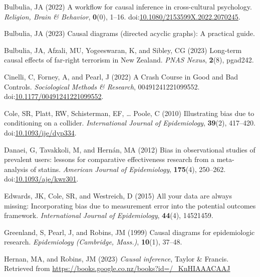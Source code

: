 \documentclass[
  singlecolumn]{article}
\newlength{\cslhangindent}
\newenvironment{CSLReferences}[2] %
 {\begin{list}{}{%
  \setlength{\itemindent}{0pt}
  \setlength{\leftmargin}{0pt}
  \setlength{\parsep}{0pt}
  \ifodd #1
   \setlength{\leftmargin}{\cslhangindent}
   \setlength{\itemindent}{-1\cslhangindent}
  \fi
  \setlength{\itemsep}{#2\baselineskip}}}
 {\end{list}}
\begin{document}
\label{refs}
\begin{CSLReferences}{1}{0}
Bulbulia, JA (2022) A workflow for causal inference in cross-cultural
psychology. \emph{Religion, Brain \& Behavior}, \textbf{0}(0), 1--16.
doi:\href{https://doi.org/10.1080/2153599X.2022.2070245}{10.1080/2153599X.2022.2070245}.

Bulbulia, JA (2023) Causal diagrams (directed acyclic graphs): A
practical guide.

Bulbulia, JA, Afzali, MU, Yogeeswaran, K, and Sibley, CG (2023)
Long-term causal effects of far-right terrorism in {N}ew {Z}ealand.
\emph{PNAS Nexus}, \textbf{2}(8), pgad242.

Cinelli, C, Forney, A, and Pearl, J (2022) A Crash Course in Good and
Bad Controls. \emph{Sociological Methods \& Research},
00491241221099552.
doi:\href{https://doi.org/10.1177/00491241221099552}{10.1177/00491241221099552}.

Cole, SR, Platt, RW, Schisterman, EF, \ldots{} Poole, C (2010)
Illustrating bias due to conditioning on a collider. \emph{International
Journal of Epidemiology}, \textbf{39}(2), 417--420.
doi:\href{https://doi.org/10.1093/ije/dyp334}{10.1093/ije/dyp334}.

Danaei, G, Tavakkoli, M, and Hernán, MA (2012) Bias in observational
studies of prevalent users: lessons for comparative effectiveness
research from a meta-analysis of statins. \emph{American Journal of
Epidemiology}, \textbf{175}(4), 250--262.
doi:\href{https://doi.org/10.1093/aje/kwr301}{10.1093/aje/kwr301}.

Edwards, JK, Cole, SR, and Westreich, D (2015) All your data are always
missing: Incorporating bias due to measurement error into the potential
outcomes framework. \emph{International Journal of Epidemiology},
\textbf{44}(4), 14521459.

Greenland, S, Pearl, J, and Robins, JM (1999) Causal diagrams for
epidemiologic research. \emph{Epidemiology (Cambridge, Mass.)},
\textbf{10}(1), 37--48.

Hernan, MA, and Robins, JM (2023) \emph{Causal inference}, Taylor \&
Francis. Retrieved from
\url{https://books.google.co.nz/books?id=/_KnHIAAACAAJ}


\end{CSLReferences}
\end{document}
